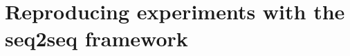 \chapter{Reproducing experiments with the seq2seq framework}
\label{appendix:software_usage}
\blindtext
